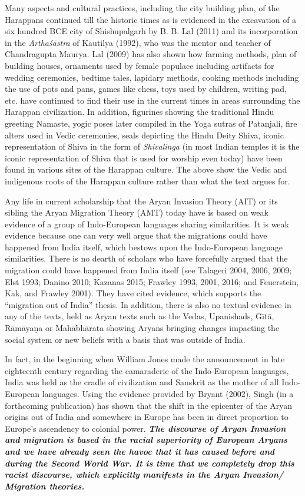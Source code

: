 \noindent
Many aspects and cultural practices, including the city building plan, of the Harappans continued till the historic times as is evidenced in the excavation of a six hundred BCE city of Shishupalgarh by B. B. Lal (2011) and its incorporation in the \textit{Arthaśāstra} of Kautilya (1992), who was the mentor and teacher of Chandragupta Maurya. Lal (2009) has also shown how farming methods, plan of building houses, ornaments used by female populace including artifacts for wedding ceremonies, bedtime tales, lapidary methods, cooking methods including the use of pots and pans, games like chess, toys used by children, writing pad, etc. have continued to find their use in the current times in areas surrounding the Harappan civilization. In addition, figurines showing the traditional Hindu greeting Namaste, yogic poses later compiled in the Yoga sutras of Patanjali, fire alters used in Vedic ceremonies, seals depicting the Hindu Deity Shiva, iconic representation of Shiva in the form of \textit{Shivalinga} (in most Indian temples it is the iconic representation of Shiva that is used for worship even today) have been found in various sites of the Harappan culture. The above show the Vedic and indigenous roots of the Harappan culture rather than what the text argues for. 

Any life in current scholarship that the Aryan Invasion Theory (AIT) or its sibling the Aryan Migration Theory (AMT) today have is based on weak evidence of a group of Indo-European languages sharing similarities. It is weak evidence because one can very well argue that the migrations could have happened from India itself, which bestows upon the Indo-European language similarities. There is no dearth of scholars who have forcefully argued that the migration could have happened from India itself (see Talageri 2004, 2006, 2009; Elst 1993; Danino 2010; Kazanas 2015; Frawley 1993, 2001, 2016; and Feuerstein, Kak, and Frawley 2001). They have cited evidence, which supports the “migration out of India” thesis. In addition, there is also no textual evidence in any of the texts, held as Aryan texts such as the Vedas, Upanishads, Gītā, Rāmāyaṇa or Mahābhārata showing Aryans bringing changes impacting the social system or new beliefs with a basis that was outside of India.

In fact, in the beginning when William Jones made the announcement in late eighteenth century regarding the camaraderie of the Indo-European languages, India was held as the cradle of civilization and Sanskrit as the mother of all Indo-European languages. Using the evidence provided by Bryant (2002), Singh (in a forthcoming publication) has shown that the shift in the epicenter of the Aryan origins out of India and somewhere in Europe has been in direct proportion to Europe’s ascendency to colonial power. \textit{\textbf{The discourse of Aryan Invasion and migration is based in the racial superiority of European Aryans and we have already seen the havoc that it has caused before and during the Second World War. It is time that we completely drop this racist discourse, which explicitly manifests in the Aryan Invasion/ Migration theories.}} 

